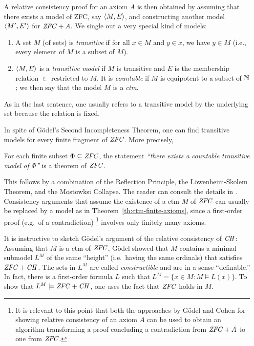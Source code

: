 A relative consistency proof for an axiom $A$ is then obtained by
assuming that there exists a model of ZFC, say $\langle M,E\rangle$, and
constructing another model $\langle M',E'\rangle$ for $\mathit{ZFC} + A$. We single
out a very special kind of models:
%
\begin{definition}\label{def:transitive-model}
  \begin{enumerate}
  \item A set $M$ (of sets) is \emph{transitive} if for all $x\in M$ and 
    $y\in x$, we have $y\in M$ (i.e., every element of $M$ is a subset
    of $M$).
  \item $\langle M,E\rangle$ is a \emph{transitive model} if $M$ is transitive
     and  $E$ is the membership relation $\in$ restricted to
    $M$. It is \emph{countable} if $M$ is equipotent to a subset of
    $\mathbb{N}$; we then say that the model  $M$ is a \emph{ctm}. 
  \end{enumerate}
\end{definition}
%
\noindent As in the last sentence, one usually refers to a transitive
model by the underlying set because the relation is fixed.
%
%

%
%
In spite of G\"odel's Second Incompleteness Theorem, one can find
transitive models for every finite fragment of $\mathit{ZFC}$. More precisely,
%
\begin{theorem}\label{th:ctm-finite-axioms}
  For each finite subset
  $\Phi\subseteq \mathit{ZFC}$, the statement \emph{``there exists a countable
    transitive model of $\Phi$''} is a theorem of $\mathit{ZFC}$.
\end{theorem}
%
\noindent This follows by a combination of the Reflection Principle, the
L\"owenheim-Skolem Theorem, and the Mostowksi Collapse. The reader can
consult the details in \cite{kunen2011set}. Consistency arguments that
assume the existence of a ctm $M$ of $\mathit{ZFC}$ can usually be replaced by
a model as in Theorem~\ref{th:ctm-finite-axioms}, since a first-order
proof (e.g.\ of a contradiction)%
%
\footnote{It is relevant to this point that 
  both the approaches by G\"odel and Cohen for showing
  relative consistency of an axiom $A$ 
  can be used to obtain an algorithm transforming a proof
  concluding a contradiction from $\mathit{ZFC}+A$ to one from $\mathit{ZFC}$.}
%
involves only finitely many axioms.

It is instructive to sketch G\"odel's argument of the relative
consistency of $\mathit{CH}$: Assuming that $M$ is a ctm of $\mathit{ZFC}$, G\"odel
showed that $M$ contains a minimal submodel $L^M$ of the same
``height'' (i.e.\ having the same ordinals) that satisfies
$\mathit{ZFC}+\mathit{CH}$. The sets in $L^M$ are called \emph{constructible} and are
in a sense ``definable.'' In fact, there is a first-order formula $L$
such that $L^M = \{x\in M : M\models L(x)\}$. To show that
$L^M\models \mathit{ZFC}+\mathit{CH}$, one uses the fact that $\mathit{ZFC}$ holds in $M$.

